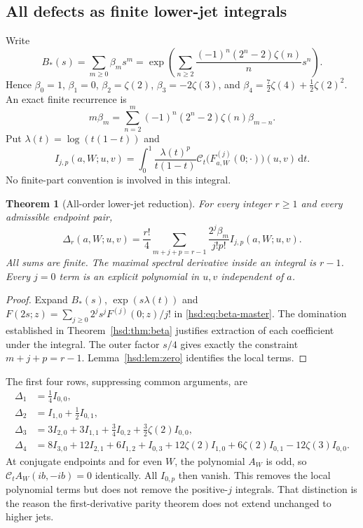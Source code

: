 \documentclass[11pt]{article}
\numberwithin{equation}{section}
\newtheorem{theorem}{Theorem}[section]
\theoremstyle{definition}\newtheorem{definition}[theorem]{Definition}
\theoremstyle{remark}\newtheorem{remark}[theorem]{Remark}
\newcommand{\dd}{\,\mathrm d}
\newcommand{\CC}{\mathcal C}
\begin{document}
\subsection{All defects as finite lower-jet integrals}
Write
\begin{equation}\label{hsd:eq:beta-coeffs}
 B_*(s)=\sum_{m\ge0}\beta_ms^m
 =\exp\left(\sum_{n\ge2}
     \frac{(-1)^n(2^n-2)\zeta(n)}{n}s^n\right).
\end{equation}
Hence $\beta_0=1$, $\beta_1=0$, $\beta_2=\zeta(2)$,
$\beta_3=-2\zeta(3)$, and
$\beta_4=\tfrac72\zeta(4)+\tfrac12\zeta(2)^2$.
An exact finite recurrence is
\begin{equation}\label{hsd:eq:beta-rec}
 m\beta_m=\sum_{n=2}^m(-1)^n(2^n-2)\zeta(n)\beta_{m-n}.
\end{equation}
Put $\lambda(t)=\log(t(1-t))$ and
\begin{equation}\label{hsd:eq:I}
 I_{j,p}(a,W;u,v)=\int_0^1\frac{\lambda(t)^p}{t(1-t)}
 \CC_t\bigl(F_{a,W}^{(j)}(0;\cdot)\bigr)(u,v)\dd t.
\end{equation}
No finite-part convention is involved in this integral.

\begin{theorem}[All-order lower-jet reduction]\label{hsd:thm:beta-jets}
For every integer $r\ge1$ and every admissible endpoint pair,
\begin{equation}\label{hsd:eq:all-beta}
 \boxed{\displaystyle
 \Delta_r(a,W;u,v)=\frac{r!}{4}
 \sum_{m+j+p=r-1}\frac{2^j\beta_m}{j!p!}I_{j,p}(a,W;u,v).}
\end{equation}
All sums are finite. The maximal spectral derivative inside an integral
is $r-1$. Every $j=0$ term is an explicit polynomial in $u,v$ independent
of $a$.
\end{theorem}
\begin{proof}
Expand $B_*(s)$, $\exp(s\lambda(t))$ and
$F(2s;z)=\sum_{j\ge0}2^js^jF^{(j)}(0;z)/j!$ in
\eqref{hsd:eq:beta-master}. The domination established in
Theorem~\ref{hsd:thm:beta} justifies extraction of each coefficient under
the integral. The outer factor $s/4$ gives exactly the constraint
$m+j+p=r-1$. Lemma~\ref{hsd:lem:zero} identifies the local terms.
\end{proof}

The first four rows, suppressing common arguments, are
\begin{align}
 \Delta_1&=\tfrac14 I_{0,0},\label{hsd:eq:beta-row1}\\
 \Delta_2&=I_{1,0}+\tfrac12I_{0,1},\label{hsd:eq:beta-row2}\\
 \Delta_3&=3I_{2,0}+3I_{1,1}+\tfrac34I_{0,2}
                         +\tfrac32\zeta(2)I_{0,0},\label{hsd:eq:beta-row3}\\
 \Delta_4&=8I_{3,0}+12I_{2,1}+6I_{1,2}+I_{0,3}
       +12\zeta(2)I_{1,0}+6\zeta(2)I_{0,1}
       -12\zeta(3)I_{0,0}.\label{hsd:eq:beta-row4}
\end{align}
At conjugate endpoints and for even $W$, the polynomial $A_W$ is odd,
so $\CC_tA_W(ib,-ib)=0$ identically. All $I_{0,p}$ then vanish.
This removes the local polynomial terms but does not remove the
positive-$j$ integrals. That distinction is the reason the
first-derivative parity theorem does not extend unchanged to higher jets.
\end{document}
